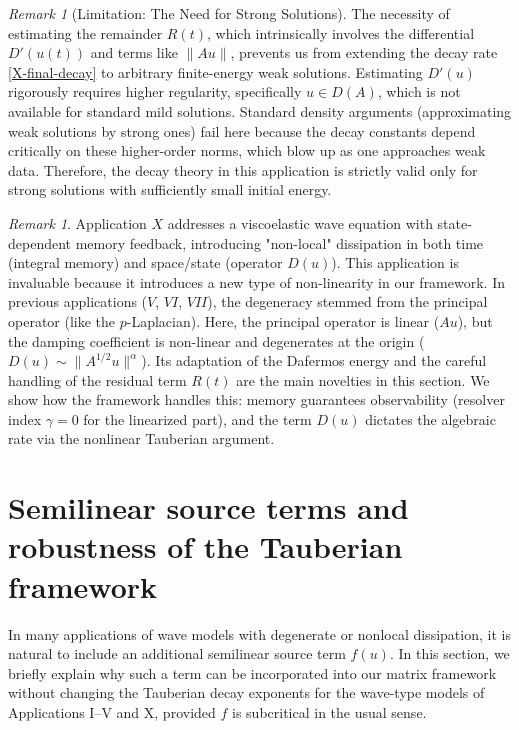\documentclass[11pt,reqno]{amsart}
\theoremstyle{remark}
\newtheorem{remark}[theorem]{Remark}
\begin{document}
\begin{remark}[Limitation: The Need for Strong Solutions]
The necessity of estimating the remainder $R(t)$, which intrinsically involves the differential $D'(u(t))$ and terms like $\|A u\|$, prevents us from extending the decay rate \eqref{X-final-decay} to arbitrary finite-energy weak solutions. Estimating $D'(u)$ rigorously requires higher regularity, specifically $u \in D(A)$, which is not available for standard mild solutions. Standard density arguments (approximating weak solutions by strong ones) fail here because the decay constants depend critically on these higher-order norms, which blow up as one approaches weak data. Therefore, the decay theory in this application is strictly valid only for strong solutions with sufficiently small initial energy.
\end{remark}



\begin{remark}
Application $X$ addresses a viscoelastic wave equation with state-dependent memory feedback, introducing "non-local" dissipation in both time (integral memory) and space/state (operator $D(u)$). This application is invaluable because it introduces a new type of non-linearity in our framework. In previous applications ($V$, $VI$, $VII$), the degeneracy stemmed from the principal operator (like the $p$-Laplacian). Here, the principal operator is linear ($A u$), but the damping coefficient is non-linear and degenerates at the origin ($D(u) \sim \|A^{1/2}u\|^\alpha$). Its adaptation of the Dafermos energy and the careful handling of the residual term $R(t)$ are the main novelties in this section. We show how the framework handles this: memory guarantees observability (resolver index $\gamma=0$ for the linearized part), and the term $D(u)$ dictates the algebraic rate via the nonlinear Tauberian argument.

\end{remark}




\section{Semilinear source terms and robustness of the Tauberian framework}\label{sec:semilinear_source}

In many applications of wave models with degenerate or nonlocal dissipation, it is natural to include an additional semilinear source term $f(u)$. In this section, we briefly explain why such a term can be incorporated into our matrix framework without changing the Tauberian decay exponents for the wave-type models of Applications I--V and X, provided $f$ is subcritical in the usual sense.
\end{document}
